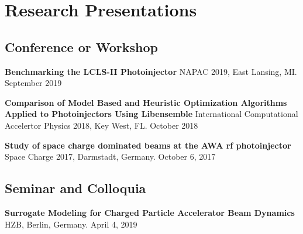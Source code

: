 \documentclass[11pt,a4paper,sans]{moderncv}        %
\begin{document}
\newpage
%
%
%
%
%

\section{Research Presentations}
\subsection{Conference or Workshop} %
\textbf{Benchmarking the LCLS-II Photoinjector}\newline
NAPAC 2019, East Lansing, MI. September 2019
\vspace{0.3em}

\textbf{Comparison of Model Based and Heuristic Optimization Algorithms \newline
	Applied to Photoinjectors Using Libensemble}\newline
International Computational Accelertor Physics 2018, Key West, FL. October 2018
\vspace{0.3em}

\textbf{Study of space charge dominated beams at the AWA rf photoinjector}\newline
Space Charge 2017, Darmstadt, Germany. October 6, 2017

\subsection{Seminar and Colloquia}
\textbf{Surrogate Modeling for Charged Particle Accelerator Beam Dynamics}\newline
HZB, Berlin, Germany. April 4, 2019
\vspace{0.3em}
\end{document}
